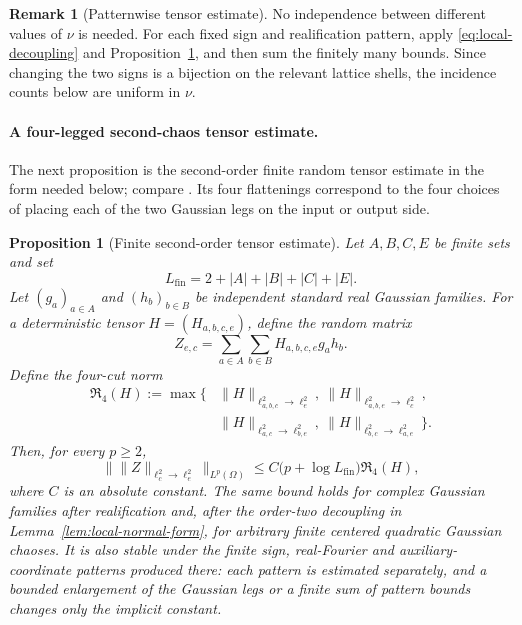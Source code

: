 \documentclass[11pt,reqno]{amsart}
\numberwithin{equation}{section}
\theoremstyle{plain}
\newtheorem{proposition}[theorem]{Proposition}
\theoremstyle{definition}
\newtheorem{remark}[theorem]{Remark}
\newcommand{\Lfin}{L_{\mathrm{fin}}}
\begin{document}
\begin{remark}[Patternwise tensor estimate]\label{rem:patternwise-tensor}
No independence between different values of \(\nu\) is needed.  For each
fixed sign and realification pattern, apply \eqref{eq:local-decoupling} and
Proposition~\ref{prop:tensor}, and then sum the finitely many bounds.  Since
changing the two signs is a bijection on the relevant lattice shells, the
incidence counts below are uniform in \(\nu\).
\end{remark}

\paragraph{A four-legged second-chaos tensor estimate.}
The next proposition is the second-order finite random tensor estimate in
the form needed below; compare \cite{DNYTensor,Kaneshiro}.  Its four
flattenings correspond to the four choices of placing each of the two
Gaussian legs on the input or output side.

\begin{proposition}[Finite second-order tensor estimate]\label{prop:tensor}
Let \(A,B,C,E\) be finite sets and set
\[
        \Lfin=2+|A|+|B|+|C|+|E|.
\]
Let \((g_a)_{a\in A}\) and \((h_b)_{b\in B}\) be independent standard real Gaussian families.  For a deterministic tensor \(H=(H_{a,b,c,e})\), define the random matrix
\begin{equation}\label{eq:tensor-Z}
        Z_{e,c}=\sum_{a\in A}\sum_{b\in B}H_{a,b,c,e}g_ah_b .
\end{equation}
Define the four-cut norm
\begin{equation}\label{eq:four-flattenings}
\begin{aligned}
\mathfrak R_4(H):=\max\bigl\{&
  \|H\|_{\ell^2_{a,b,c}\to\ell^2_e},
  \ \|H\|_{\ell^2_{a,b,e}\to\ell^2_c},\\
 &\|H\|_{\ell^2_{a,c}\to\ell^2_{b,e}},
  \ \|H\|_{\ell^2_{b,c}\to\ell^2_{a,e}}
\bigr\}.
\end{aligned}
\end{equation}
Then, for every \(p\ge2\),
\begin{equation}\label{eq:tensor-bound}
        \bigl\|\|Z\|_{\ell^2_c\to\ell^2_e}\bigr\|_{L^p(\Omega)}
        \le C\bigl(p+\log\Lfin\bigr)\mathfrak R_4(H),
\end{equation}
where \(C\) is an absolute constant.  The same bound holds for complex Gaussian families after realification and, after the order-two decoupling in Lemma~\ref{lem:local-normal-form}, for arbitrary finite centered quadratic Gaussian chaoses.  It is also stable under the finite sign, real-Fourier and auxiliary-coordinate patterns produced there: each pattern is estimated separately, and a bounded enlargement of the Gaussian legs or a finite sum of pattern bounds changes only the implicit constant.
\end{proposition}
\end{document}
